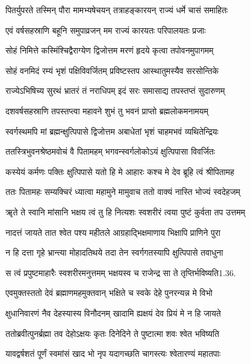 \twolineshloka
{पितर्युपरते तस्मिन् पौरा मामभ्यषेचयन्}
{तत्राहङ्कारयन् राज्यं धर्मे चासं समाहितः}%

\twolineshloka
{एवं वर्षसहस्राणि बहूनि समुपाव्रजन्}
{मम राज्यं कारयतः परिपालयतः प्रजाः}%

\twolineshloka
{सोहं निमित्ते कस्मिंश्चिद्वैराग्येण द्विजोत्तम}
{मरणं हृदये कृत्वा तपोवनमुपागमम्}%

\twolineshloka
{सोहं वनमिदं रम्यं भृशं पक्षिविवर्जितम्}
{प्रविष्टस्तप आस्थातुमस्यैव सरसोन्तिके}%

\twolineshloka
{राज्येऽभिषिच्य सुरथं भ्रातरं तं नराधिपम्}
{इदं सरः समासाद्य तपस्तप्तं सुदारुणम्}%

\twolineshloka
{दशवर्षसहस्राणि तपस्तप्त्वा महावने}
{शुभं तु भवनं प्राप्तो ब्रह्मलोकमनामयम्}%

\twolineshloka
{स्वर्गस्थमपि मां ब्रह्मन्क्षुत्पिपासे द्विजोत्तम}
{अबाधेतां भृशं चाहमभवं व्यथितेन्द्रियः}%

\twolineshloka
{ततस्त्रिभुवनश्रेष्ठमवोचं वै पितामहम्}
{भगवन्स्वर्गलोकोऽयं क्षुत्पिपासा विवर्जितः}%

\twolineshloka
{कस्येयं कर्मणः पक्तिः क्षुत्पिपासे यतो हि मे}
{आहारः कश्च मे देव ब्रूहि त्वं श्रीपितामह}%

\twolineshloka
{ततः पितामहः सम्यक्चिरं ध्यात्वा महामुने}
{मामुवाच ततो वाक्यं नास्ति भोज्यं स्वदेहजम्}%

\twolineshloka
{ॠते ते स्वानि मांसानि भक्षय त्वं तु हि नित्यशः}
{स्वशरीरं त्वया पुष्टं कुर्वता तप उत्तमम्}%

\twolineshloka
{नादत्तं जायते तात श्वेत पश्य महीतले}
{आग्रहाद्भिक्षमाणाय भिक्षापि प्राणिने पुरा}%

\twolineshloka
{न हि दत्ता गृहे भ्रान्त्या मोहादतिथये तदा}
{तेन स्वर्गगतस्यापि क्षुत्पिपासे तवाधुना}%

\twolineshloka
{स त्वं प्रपुष्टमाहारैः स्वशरीरमनुत्तमम्}
{भक्षयस्व च राजेन्द्र सा ते तृप्तिर्भविष्यति1.36.}%

\twolineshloka
{एवमुक्तस्ततो देवं ब्रह्माणमहमुक्तवान्}
{भक्षिते च स्वके देहे पुनरन्यन्न मे विभो}%

\twolineshloka
{क्षुधानिवारणं नैव देहस्यास्य विनौदनम्}
{खादामि ह्यक्षयं देव प्रियं मे न हि जायते}%

\twolineshloka
{ततोब्रवीत्पुनर्ब्रह्मा तव देहोऽक्षयः कृतः}
{दिनेदिने ते पुष्टात्मा शवः श्वेत भविष्यति}%

\twolineshloka
{यावद्वर्षशतं पूर्णं स्वमांसं खाद भो नृप}
{यदागच्छति चागस्त्यः श्वेतारण्यं महातपाः}%

